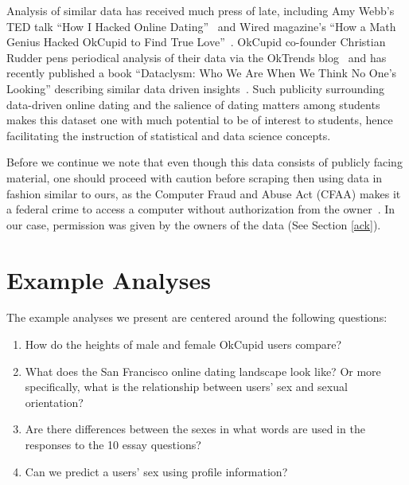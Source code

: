 \documentclass{article}\usepackage[]{graphicx}\usepackage[]{color}
\begin{document}
Analysis of similar data has received much press of late, including Amy Webb's TED talk ``How I Hacked Online Dating''~\cite{TED} and Wired magazine's ``How a Math Genius Hacked OkCupid to Find True Love''~\cite{Wired}.  OkCupid co-founder Christian Rudder pens periodical analysis of their data via the OkTrends blog~\cite{OkTrends} and has recently published a book ``Dataclysm: Who We Are When We Think No One's Looking'' describing similar data driven insights~\cite{dataclysm}.  Such publicity surrounding data-driven online dating and the salience of dating matters among students makes this dataset one with much potential to be of interest to students, hence facilitating the instruction of statistical and data science concepts.

Before we continue we note that even though this data consists of publicly facing material, one should proceed with caution before scraping then using data in fashion similar to ours, as the Computer Fraud and Abuse Act (CFAA) makes it a federal crime to access a computer without authorization from the owner~\cite{pando}.  In our case, permission was given by the owners of the data (See Section \ref{ack}).










%
\section{Example Analyses}\label{analyses}
%
The example analyses we present are centered around the following questions:

\begin{enumerate}
\item How do the heights of male and female OkCupid users compare?
\item What does the San Francisco online dating landscape look like?  Or more specifically, what is the relationship between users' sex and sexual orientation?
\item Are there differences between the sexes in what words are used in the responses to the 10 essay questions?
\item Can we predict a users' sex using profile information?
\end{enumerate}
\end{document}
